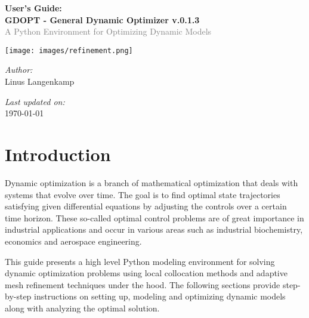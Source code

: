 \documentclass[12pt]{article}
\date{\today}
\begin{document}
\begin{titlepage}
	\centering

	\vspace*{2.5cm}

	{\LARGE\bfseries User's Guide:}\\[1em]

	{\LARGE\bfseries GDOPT - General Dynamic Optimizer v.0.1.3}\\[0.5em]
	\textcolor{gray}{\large A Python Environment for Optimizing
		Dynamic Models}\\[1em]

	\vspace{2cm}

	\texttt{[image: images/refinement.png]}\par\vspace{1cm}
	\vspace{2cm}

	{\large \textit{Author:}}\\[0.5em]
	{\large Linus Langenkamp}

	\vfill
	{\large \textit{Last updated on:}}\\[0.5em]
	{\large \today}

	\vspace*{1cm}
\end{titlepage}

\newpage
\fancyhead[R]{}
\thispagestyle{fancy}
\tableofcontents
\newpage

\fancyhead[R]{\leftmark}  %

\clearpage
\pagestyle{fancy}
\setcounter{page}{1}
\section{Introduction}

Dynamic optimization is a branch of mathematical optimization that deals with
systems that evolve over time. The goal is to find optimal state trajectories
satisfying given differential equations by adjusting the controls over a
certain time horizon. These so-called optimal control problems are of great
importance in industrial applications and occur in various areas such as
industrial biochemistry, economics and aerospace engineering.

This guide presents a high level Python modeling environment for
solving dynamic optimization problems using local collocation methods and
adaptive mesh refinement techniques under the hood.
The following sections provide
step-by-step instructions on setting up, modeling and optimizing dynamic models
along with analyzing the optimal solution.
\end{document}
